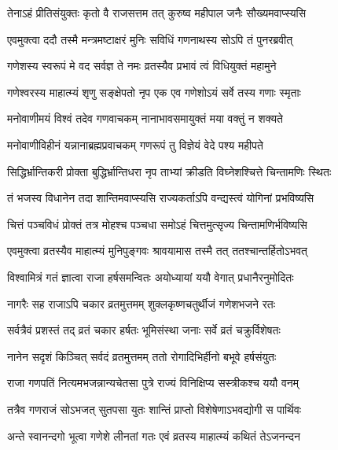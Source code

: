 \twolineshloka
{तेनाऽहं प्रीतिसंयुक्तः कृतो वै राजसत्तम}
{तत् कुरुष्व महीपाल जनैः सौख्यमवाप्स्यसि} %

\twolineshloka
{एवमुक्त्वा ददौ तस्मै मन्त्रमष्टाक्षरं मुनिः}
{सविधिं गणनाथस्य सोऽपि तं पुनरब्रवीत्} %


\twolineshloka
{गणेशस्य स्वरूपं मे वद सर्वज्ञ ते नमः}
{व्रतस्यैव प्रभावं त्वं विधियुक्तं महामुने} %


\twolineshloka
{गणेश्वरस्य माहात्म्यं श‍ृणु सङ्क्षेपतो नृप}
{एक एव गणेशोऽयं सर्वे तस्य गणाः स्मृताः} %

\twolineshloka
{मनोवाणीमयं विश्वं तदेव गणवाचकम्}
{नानाभावसमायुक्तं मया वक्तुं न शक्यते} %

\twolineshloka
{मनोवाणीविहीनं यन्नानाब्रह्मप्रवाचकम्}
{गणरूपं तु विज्ञेयं वेदे पश्य महीपते} %

\twolineshloka
{सिद्धिर्भ्रान्तिकरी प्रोक्ता बुद्धिर्भ्रान्तिधरा नृप}
{ताभ्यां क्रीडति विघ्नेशश्चित्ते चिन्तामणिः स्थितः} %

\twolineshloka
{तं भजस्व विधानेन तदा शान्तिमवाप्स्यसि}
{राज्यकर्ताऽपि वन्द्यस्त्वं योगिनां प्रभविष्यसि} %

\twolineshloka
{चित्तं पञ्चविधं प्रोक्तं तत्र मोहश्च पञ्चधा}
{समोऽहं चित्तमुत्सृज्य चिन्तामणिर्भविष्यसि} %

\twolineshloka
{एवमुक्त्वा व्रतस्यैव माहात्म्यं मुनिपुङ्गवः}
{श्रावयामास तस्मै तत् ततश्चान्तर्हितोऽभवत्} %

\twolineshloka
{विश्वामित्रं गतं ज्ञात्वा राजा हर्षसमन्वितः}
{अयोध्यायां ययौ वेगात् प्रधानैरनुमोदितः} %

\twolineshloka
{नागरैः सह राजाऽपि चकार व्रतमुत्तमम्}
{शुक्लकृष्णचतुर्थीजं गणेशभजने रतः} %

\twolineshloka
{सर्वत्रैवं प्रशस्तं तद् व्रतं चकार हर्षतः}
{भूमिसंस्था जनाः सर्वे व्रतं चक्रुर्विशेषतः} %

\twolineshloka
{नानेन सदृशं किञ्चित् सर्वदं व्रतमुत्तमम्}
{ततो रोगादिभिर्हीनो बभूवे हर्षसंयुतः} %

\twolineshloka
{राजा गणपतिं नित्यमभजन्नान्यचेतसा}
{पुत्रे राज्यं विनिक्षिप्य सस्त्रीकश्च ययौ वनम्} %

\twolineshloka
{तत्रैव गणराजं सोऽभजत् सुतपसा युतः}
{शान्तिं प्राप्तो विशेषेणाऽभवद्योगी स पार्थिवः} %

\twolineshloka
{अन्ते स्वानन्दगो भूत्वा गणेशे लीनतां गतः}
{एवं व्रतस्य माहात्म्यं कथितं तेऽजनन्दन} %

